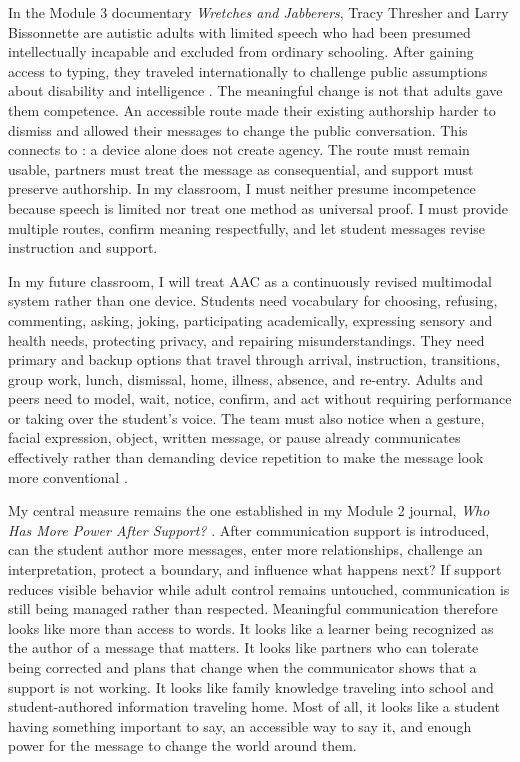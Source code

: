 
In the Module 3 documentary \textit{Wretches and Jabberers}, Tracy Thresher and Larry Bissonnette are autistic adults with limited speech who had been presumed intellectually incapable and excluded from ordinary schooling. After gaining access to typing, they traveled internationally to challenge public assumptions about disability and intelligence \citep{wurzburg2013wretches}. The meaningful change is not that adults gave them competence. An accessible route made their existing authorship harder to dismiss and allowed their messages to change the public conversation. This connects to \citet{norrie2021context}: a device alone does not create agency. The route must remain usable, partners must treat the message as consequential, and support must preserve authorship. In my classroom, I must neither presume incompetence because speech is limited nor treat one method as universal proof. I must provide multiple routes, confirm meaning respectfully, and let student messages revise instruction and support.


In my future classroom, I will treat AAC as a continuously revised multimodal system rather than one device. Students need vocabulary for choosing, refusing, commenting, asking, joking, participating academically, expressing sensory and health needs, protecting privacy, and repairing misunderstandings. They need primary and backup options that travel through arrival, instruction, transitions, group work, lunch, dismissal, home, illness, absence, and re-entry. Adults and peers need to model, wait, notice, confirm, and act without requiring performance or taking over the student's voice. The team must also notice when a gesture, facial expression, object, written message, or pause already communicates effectively rather than demanding device repetition to make the message look more conventional \citep{mirenda2015aids}.

My central measure remains the one established in my Module 2 journal, \textit{Who Has More Power After Support?} \citep{garciabautista2026module2journal}. After communication support is introduced, can the student author more messages, enter more relationships, challenge an interpretation, protect a boundary, and influence what happens next? If support reduces visible behavior while adult control remains untouched, communication is still being managed rather than respected. Meaningful communication therefore looks like more than access to words. It looks like a learner being recognized as the author of a message that matters. It looks like partners who can tolerate being corrected and plans that change when the communicator shows that a support is not working. It looks like family knowledge traveling into school and student-authored information traveling home. Most of all, it looks like a student having something important to say, an accessible way to say it, and enough power for the message to change the world around them.
